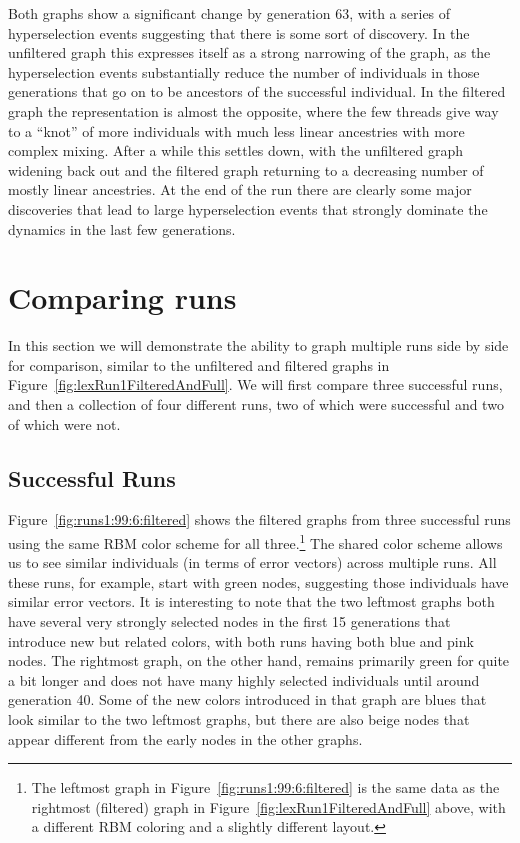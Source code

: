\documentclass{sig-alternate}
\begin{document}
Both graphs show a significant change by generation 63, with a series of
hyperselection events suggesting that there is some sort of discovery. In the
unfiltered graph this expresses itself as a strong narrowing of the graph, as
the hyperselection events substantially reduce the number of individuals in
those generations that go on to be ancestors of the successful individual. In
the filtered graph the representation is almost the opposite, where the few
threads give way to a ``knot'' of more individuals with much less linear 
ancestries with more complex mixing. After a while this settles down, with the
unfiltered graph widening back out and the filtered graph returning to a
decreasing number of mostly linear ancestries. At the end of the run there are
clearly some major discoveries that lead to large hyperselection events that
strongly dominate the dynamics in the last few generations.

\section{Comparing runs}
\label{sec:comparisons}

In this section we will demonstrate the ability to graph multiple runs side by
side for comparison, similar to the unfiltered and filtered graphs in 
Figure~\ref{fig:lexRun1FilteredAndFull}. We will first compare three successful
runs, and then a collection of four different runs, two of which were successful 
and two of which were not.

\subsection{Successful Runs}

Figure~\ref{fig:runs1:99:6:filtered} shows the filtered graphs from three successful 
runs using the same RBM color scheme for all three.\footnote{The leftmost graph in
Figure~\ref{fig:runs1:99:6:filtered} is the same data as the rightmost (filtered)
graph in Figure~\ref{fig:lexRun1FilteredAndFull} above, with a different RBM coloring
and a slightly different layout.} 
The shared color scheme allows us to see similar individuals (in terms of error vectors)
across multiple runs. All these runs, for example, start with green nodes, suggesting
those individuals have similar error vectors. It is interesting to note that the two
leftmost graphs both have several very strongly selected nodes in the first 15 generations
that introduce new but related colors, with both runs having both blue and pink nodes.
The rightmost graph, on the other hand, remains primarily green for quite a bit longer
and does not have many highly selected individuals until around generation 40. Some of 
the new colors introduced in that graph are blues that look similar to the two leftmost
graphs, but there are also beige nodes that appear different from the early nodes in
the other graphs.
\end{document}
